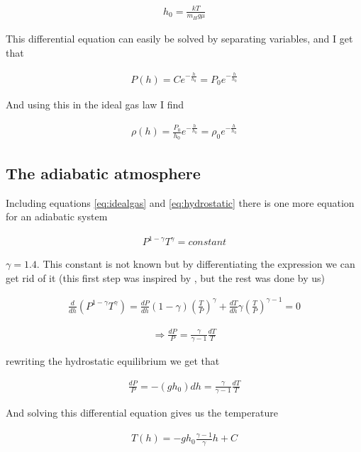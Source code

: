 \documentclass[a4paper, 10pt]{article}
\begin{document}
\begin{align}
h_0 = \frac{kT}{m_H g \mu}
\end{align}

This differential equation can easily be solved by separating variables, and I get that

\begin{align}
P(h) = C e^{-\frac{h}{h_0}} = P_0 e^{-\frac{h}{h_0}}
\end{align}

And using this in the ideal gas law I find

\begin{align}
\rho (h) = \frac{P_0}{h_0} e^{-\frac{h}{h_0}} = \rho_0 e^{-\frac{h}{h_0}}
\end{align}

\subsection{The adiabatic atmosphere}
Including equations \ref{eq:idealgas} and \ref{eq:hydrostatic} there is one more equation for an adiabatic system

\begin{align}\label{eq:abiabatic}
P^{1-\gamma}T^{\gamma} = constant
\end{align}

$\gamma = 1.4$. This constant is not known but by differentiating the expression we can get rid of it (this first step was inspired by \cite{adia}, but the rest was done by us)

\begin{align}
\frac{d}{dh}(P^{1-\gamma}T^{\gamma}) = \frac{dP}{dh}(1-\gamma)\left(\frac{T}{P} \right)^{\gamma} + \frac{dT}{dh}\gamma \left(\frac{T}{P} \right)^{\gamma-1} = 0
\end{align}

\begin{align}
\Rightarrow \frac{dP}{P} = \frac{\gamma}{\gamma - 1}\frac{dT}{T}
\end{align}

rewriting the hydrostatic equilibrium we get that

\begin{align}
\frac{dP}{P} = -(g h_0) dh = \frac{\gamma}{\gamma - 1}\frac{dT}{T}
\end{align}

And solving this differential equation gives us the temperature

\begin{align}
T(h) = -g h_0 \frac{\gamma-1}{\gamma}h + C
\end{align}
\end{document}
